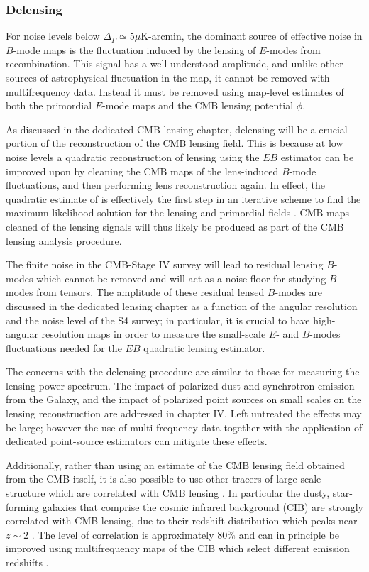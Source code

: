 \subsubsection{Delensing}
For noise levels below $\Delta_P \simeq 5 \mu$K-arcmin,  the dominant source of effective noise in $B$-mode maps is the fluctuation induced by the lensing of $E$-modes from recombination.  This signal has a well-understood amplitude, and unlike other sources of astrophysical fluctuation in the map, it cannot be removed with multifrequency data.  Instead it must be removed using map-level estimates of both the primordial $E$-mode maps and the CMB lensing potential $\phi$.  

As discussed in the dedicated CMB lensing chapter, delensing will be a crucial portion of the reconstruction of the CMB lensing field.  This is because at low noise levels a quadratic reconstruction of lensing using the $EB$ estimator \cite{Hu:2001kj} can be improved upon by cleaning the CMB maps of the lens-induced $B$-mode fluctuations, and then performing lens reconstruction again.  In effect, the quadratic estimate of \cite{Hu:2001kj} is effectively the first step in an iterative scheme to find the maximum-likelihood solution for the lensing and primordial fields \cite{HirataSeljak0209489}.  CMB maps cleaned of the lensing signals will thus likely be produced as part of the CMB lensing analysis procedure.

The finite noise in the CMB-Stage IV survey will lead to residual lensing $B$-modes which cannot be removed and will act as a noise floor for studying $B$ modes from tensors.  The amplitude of these residual lensed $B$-modes are discussed in the dedicated lensing chapter as a function of the angular resolution and the noise level of the S4 survey; in particular, it is crucial to have high-angular resolution maps in order to measure the small-scale $E$- and $B$-modes fluctuations needed for the $EB$ quadratic lensing estimator.

The concerns with the delensing procedure are similar to those for measuring the lensing power spectrum. The impact of polarized dust and synchrotron emission from the Galaxy, and the impact of polarized point sources on small scales on the lensing reconstruction are addressed in chapter IV. Left untreated the effects may be large; however the use of  multi-frequency data together with the application of dedicated point-source estimators can mitigate these effects.

Additionally, rather than using an estimate of the CMB lensing field obtained from the CMB itself, it is also possible to use other tracers of large-scale structure which are correlated with  CMB lensing \cite{smith10}.  In particular the dusty, star-forming galaxies that comprise the cosmic infrared background (CIB) are strongly correlated with CMB lensing, due to their redshift distribution which peaks near $z \sim 2$ \cite{sherwin15,simard15}.  The level of correlation is approximately $80\%$ \cite{planck13-18} and can in principle be improved using multifrequency maps of the CIB which select different emission redshifts \cite{sherwin15}.  

